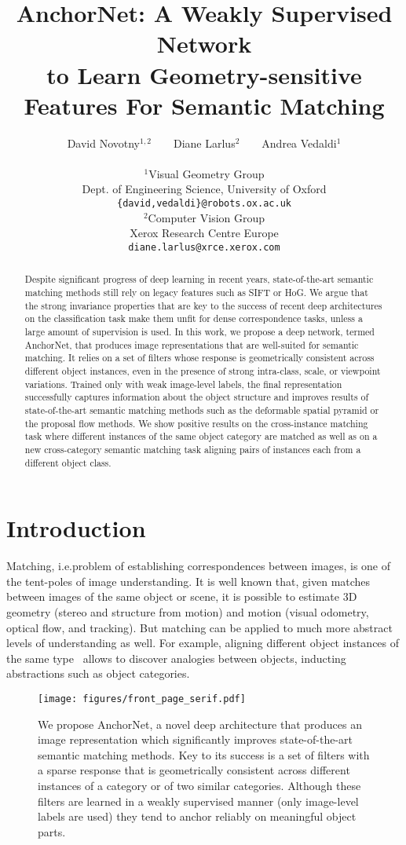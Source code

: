 \documentclass[10pt,twocolumn,letterpaper]{article}
\title{AnchorNet: A Weakly Supervised Network \\ to Learn Geometry-sensitive Features For Semantic Matching}
\author{
David Novotny$^{1,2}$ ~ ~ Diane Larlus$^2$ ~ ~ Andrea Vedaldi$^1$ \\
\begin{minipage}{.5\textwidth}
\centering
$^1$\small{Visual Geometry Group\\Dept. of Engineering Science, University of Oxford\\}
{\tt\small \{david,vedaldi\}@robots.ox.ac.uk}
\end{minipage} 
\begin{minipage}{.5\textwidth}
\centering
$^2$\small{Computer Vision Group\\Xerox Research Centre Europe\\} 
{\tt\small diane.larlus@xrce.xerox.com}
\end{minipage}
}
\begin{document}
\maketitle
\begin{abstract} 
Despite significant progress of deep learning in recent years, 
state-of-the-art semantic matching methods still rely on legacy features such as SIFT or HoG. We argue that the strong invariance properties that are key to the success of recent deep architectures on the classification task make them unfit for dense correspondence tasks, unless a large amount of supervision is used. In this work, we propose a deep network, termed AnchorNet, that produces image representations that are well-suited for semantic matching. It relies on a set of filters whose response is geometrically consistent across different object instances, even in the presence of strong intra-class, scale, or viewpoint variations. Trained only with weak image-level labels, the final representation successfully captures information about the object structure and improves results of state-of-the-art semantic matching methods such as the deformable spatial pyramid or the proposal flow methods.
We show positive results on the cross-instance matching task where different instances of the same object category are matched as well as
on a new cross-category semantic matching task aligning pairs of instances each from a different object class.
\end{abstract}

\section{Introduction}\label{sec:intro}

Matching, i.e.\the problem of establishing correspondences between images, is one of the tent-poles of image understanding. It is well known that, given matches between images of the same object or scene, it is possible to estimate 3D geometry (stereo and structure from motion) and motion (visual odometry, optical flow, and tracking).
But matching can be applied to much more abstract levels of understanding as well. For example, aligning different object instances of the same type~\cite{kim2013deformable,ham2016} allows to discover analogies between objects, inducting abstractions such as object categories.

\begin{figure}[t!]
  \centering
  \texttt{[image: figures/front\_page\_serif.pdf]}
  \caption{We propose AnchorNet, a novel deep architecture that produces an image representation which significantly improves state-of-the-art semantic matching methods. Key to its success is a set of filters with a sparse response that is geometrically consistent across different instances of a category or of two similar categories. Although these filters are learned in a weakly supervised manner (\ie only image-level labels are used) they tend to anchor reliably on meaningful object parts. }\label{f:splash}
\end{figure}
\end{document}
